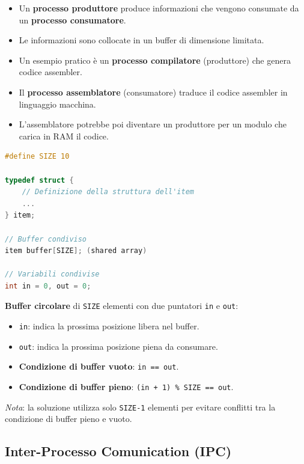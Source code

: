 \begin{itemize}
    \item Un \textbf{processo produttore} produce informazioni che vengono consumate da un \textbf{processo consumatore}.
    \item Le informazioni sono collocate in un buffer di dimensione limitata.
    \item Un esempio pratico è un \textbf{processo compilatore} (produttore) che genera codice assembler.
    \item Il \textbf{processo assemblatore} (consumatore) traduce il codice assembler in linguaggio macchina.
    \item L'assemblatore potrebbe poi diventare un produttore per un modulo che carica in RAM il codice.
\end{itemize}

\begin{lstlisting}[language=C]
#define SIZE 10

typedef struct {
    // Definizione della struttura dell'item
    ...
} item;

// Buffer condiviso
item buffer[SIZE]; (shared array)

// Variabili condivise
int in = 0, out = 0; 
\end{lstlisting}

\textbf{Buffer circolare} di \texttt{SIZE} elementi con due puntatori \texttt{in} e \texttt{out}:
\begin{itemize}
    \item \texttt{in}: indica la prossima posizione libera nel buffer.
    \item \texttt{out}: indica la prossima posizione piena da consumare.
    \item \textbf{Condizione di buffer vuoto}: \texttt{in == out}.
    \item \textbf{Condizione di buffer pieno}: \texttt{(in + 1) \% SIZE == out}.
\end{itemize}

\textit{Nota}: la soluzione utilizza solo \texttt{SIZE-1} elementi per evitare conflitti tra la condizione di buffer pieno e vuoto.

\subsection{Inter-Processo Comunication (IPC)}

